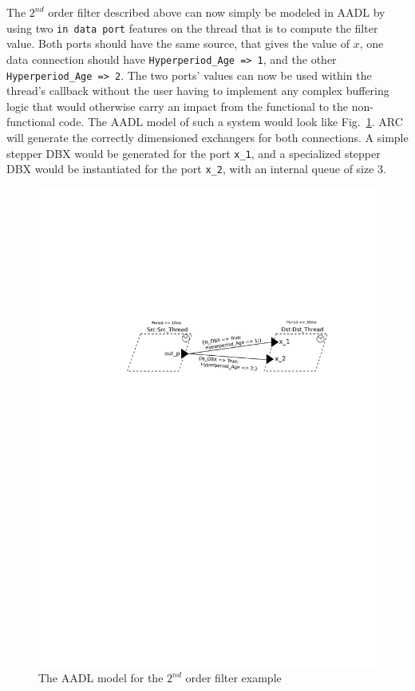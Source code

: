 The $2^{nd}$ order filter described above can now simply be modeled in
AADL by using two \texttt{in data port} features on the thread that is
to compute the filter value. Both ports should have the same source,
that gives the value of $x$, one data connection should have
\texttt{Hyperperiod\_Age => 1}, and the other \texttt{Hyperperiod\_Age
  => 2}. The two ports' values can now be used within the thread's
callback without the user having to implement any complex buffering
logic that would otherwise carry an impact from the functional to the
non-functional code. The AADL model of such a system would look like
Fig.~\ref{fig:ho-example}. ARC will generate the correctly dimensioned
exchangers for both connections. A simple stepper DBX would be
generated for the port \texttt{x\_1}, and a specialized stepper DBX
would be instantiated for the port \texttt{x\_2}, with an internal
queue of size 3.

\begin{figure}
\centering \includegraphics{figs/ho-example}
\caption{The AADL model for the $2^{nd}$ order filter example}
\label{fig:ho-example}
\end{figure}

